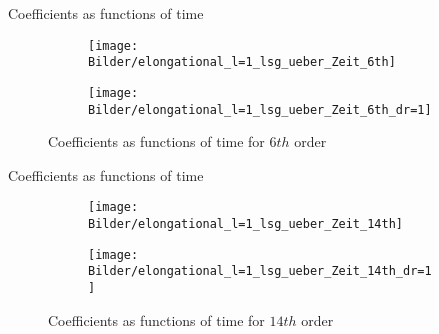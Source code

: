 \begin{frame}{Coefficients as functions of time}
	\begin{figure}
		\begin{subfigure}{0.48\textwidth}
			\texttt{[image: Bilder/elongational\_l=1\_lsg\_ueber\_Zeit\_6th]}
		\end{subfigure}
		\hfill
		\begin{subfigure}{0.48\textwidth}
			\texttt{[image: Bilder/elongational\_l=1\_lsg\_ueber\_Zeit\_6th\_dr=1]}
		\end{subfigure}
		\caption{Coefficients as functions of time for $6th$ order}
	\end{figure}
\end{frame}


\begin{frame}{Coefficients as functions of time}
	\begin{figure}
		\begin{subfigure}{0.48\textwidth}
			\texttt{[image: Bilder/elongational\_l=1\_lsg\_ueber\_Zeit\_14th]}
		\end{subfigure}
		\hfill
		\begin{subfigure}{0.48\textwidth}
			\texttt{[image: Bilder/elongational\_l=1\_lsg\_ueber\_Zeit\_14th\_dr=1]}
		\end{subfigure}
		\caption{Coefficients as functions of time for $14th$ order}
	\end{figure}
\end{frame}






